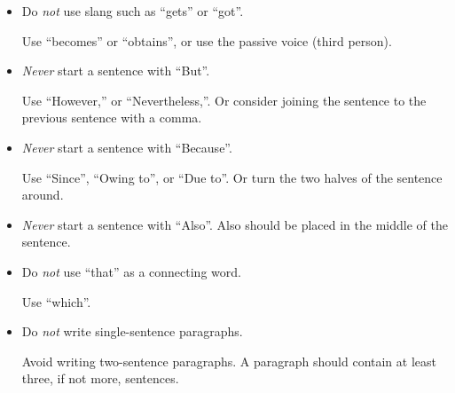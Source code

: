 \begin{itemize}
\item Do \emph{not} use slang such as \enquote{gets} or \enquote{got}.

Use \enquote{becomes} or \enquote{obtains}, or use the passive voice (third
person).






\item \emph{Never} start a sentence with \enquote{But}.

Use \enquote{However,} or \enquote{Nevertheless,}. Or consider joining the
sentence to the previous sentence with a comma.




\item \emph{Never} start a sentence with \enquote{Because}.

Use \enquote{Since}, \enquote{Owing to}, or \enquote{Due to}. Or turn the two
halves of the sentence around.




\item \emph{Never} start a sentence with \enquote{Also}. Also should
be placed in the middle of the sentence.




\item Do \emph{not} use \enquote{that} as a connecting word.

Use \enquote{which}.





\item Do \emph{not} write single-sentence paragraphs. 

Avoid writing two-sentence paragraphs. A paragraph should contain at
least three, if not more, sentences.


\end{itemize}











